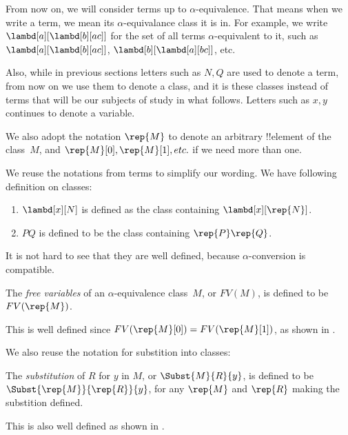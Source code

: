 \documentclass[../../../include/open-logic-section]{subfiles}
\begin{document}

From now on, we will consider terms up to $\alpha$-equivalence.  That
means when we write a term, we mean its $\alpha$-equivalance class it
is in. For example, we write $\lambd[a][\lambd[b][a c]]$ for the set
of all terms $\alpha$-equivalent to it, such as $\lambd[a][\lambd[b][a
    c]]$, $\lambd[b][\lambd[a][b c]]$, etc.

Also, while in previous sections letters such as $N, Q$ are used to
denote a term, from now on we use them to denote a class, and it is
these classes instead of terms that will be our subjects of study in
what follows. Letters such as $x, y$ continues to denote a variable.

We also adopt the notation $\rep{M}$ to denote an arbitrary
!!{element} of the class~$M$, and $\rep{M}[0], \rep{M}[1], etc. $ if
we need more than one.

We reuse the notations from terms to simplify our wording. We
have following definition on classes:
\begin{defn}
  \begin{enumerate}
  \item $\lambd[x][N]$ is defined as the class containing
    $\lambd[x][\rep{N}]$.
  \item $PQ$ is defined to be the class containing $\rep{P}\rep{Q}$.
  \end{enumerate}
\end{defn}

It is not hard to see that they are well defined, because
$\alpha$-conversion is compatible.

\begin{defn} 
  The \emph{free variables} of an $\alpha$-equivalence class~$M$, or
  $FV(M)$, is defined to be $FV(\rep{M})$.
\end{defn}

This is well defined since $FV(\rep{M}[0]) =
FV(\rep{M}[1])$, as shown in .

We also reuse the notation for substition into classes:
\begin{defn} 
  The \emph{substitution} of $R$ for $y$ in $M$, or $\Subst{M}{R}{y}$, is
  defined to be $\Subst{\rep{M}}{\rep{R}}{y}$, for any $\rep{M}$ and
  $\rep{R}$ making the substition defined.
\end{defn}

This is also well defined as shown in .
\end{document}
